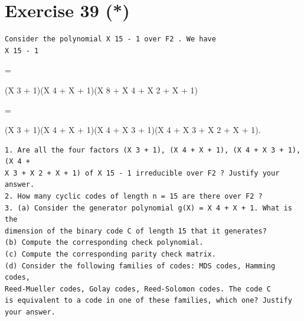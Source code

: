 \documentclass[11pt]{article}
\begin{document}
\section*{Exercise 39 (*)}
\begin{exercisebox}
\begin{Verbatim}[fontsize=\small]
Consider the polynomial X 15 - 1 over F2 . We have
X 15 - 1
\end{Verbatim}
=

(X 3 + 1)(X 4 + X + 1)(X 8 + X 4 + X 2 + X + 1)

=

(X 3 + 1)(X 4 + X + 1)(X 4 + X 3 + 1)(X 4 + X 3 + X 2 + X + 1).

\begin{Verbatim}[fontsize=\small]
1. Are all the four factors (X 3 + 1), (X 4 + X + 1), (X 4 + X 3 + 1), (X 4 +
X 3 + X 2 + X + 1) of X 15 - 1 irreducible over F2 ? Justify your answer.
2. How many cyclic codes of length n = 15 are there over F2 ?
3. (a) Consider the generator polynomial g(X) = X 4 + X + 1. What is the
dimension of the binary code C of length 15 that it generates?
(b) Compute the corresponding check polynomial.
(c) Compute the corresponding parity check matrix.
(d) Consider the following families of codes: MDS codes, Hamming codes,
Reed-Mueller codes, Golay codes, Reed-Solomon codes. The code C
is equivalent to a code in one of these families, which one? Justify
your answer.
\end{Verbatim}
\end{exercisebox}
\end{document}
